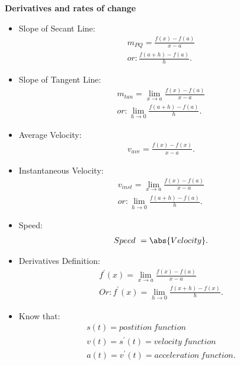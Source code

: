 \documentclass{report}
\begin{document}
      \bigbreak \noindent \bigbreak \noindent 
      \begin{large}
          \textbf{Derivatives and rates of change}
      \end{large}
          \begin{itemize}
      \item Slope of Secant Line:
        \begin{align*}
          m_{PQ} = \frac{f(x)- f(a)}{x-a} \\
          or: 
          \frac{f(a+h)- f(a)}{h}
        .\end{align*}
      \item Slope of Tangent Line:
        \begin{align*}
          m_{tan} = \lim\limits_{x \to a}{\frac{f(x)- f(a)}{x-a}} \\
          or: 
          \lim\limits_{h \to 0}{\frac{f(a+h)- f(a)}{h}}
        .\end{align*}
      \item Average Velocity:
        \begin{align*}
          v_{ave} = \frac{f(x)- f(x)}{x-a}
        .\end{align*}
      \item Instantaneous Velocity:
        \begin{align*}
          v_{inst} = \lim\limits_{x \to a}{\frac{f(x)- f(a)}{x-a}} \\
          or: 
          \lim\limits_{h \to 0}{\frac{f(a+h)- f(a)}{h}}
        .\end{align*}
      \item Speed:
        \begin{align*}
          Speed\ = \abs{Velocity}
        .\end{align*}
      \item Derivatives Definition:
        \begin{align*}
          f^{\prime}(x) = \lim\limits_{x \to a}{\frac{f(x)-f(a)}{x-a}} \\
          Or:
          f^{\prime}(x) = \lim\limits_{h \to 0}{\frac{f(x+h)-f(x)}{h}}
        .\end{align*}
      \item Know that:
    \begin{align*}
      s(t) = postition\ function \\
      v(t) = s^{\prime}(t) = velocity\ function \\
      a(t) = v^{\prime}(t) = acceleration\ function
    .\end{align*}
    \end{itemize}
    \bigbreak \noindent \bigbreak \noindent 
\end{document}
